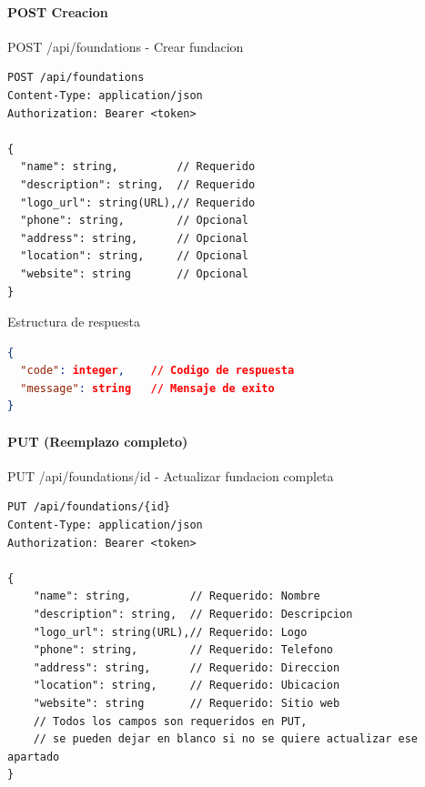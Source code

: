 \documentclass[11pt,a4paper]{article}
\begin{document}
\paragraph{POST Creacion}

\begin{center}
	\begin{minipage}{\textwidth}
		\begin{codebox}{POST /api/foundations - Crear fundacion}
			\begin{lstlisting}[language=HTTP]
POST /api/foundations
Content-Type: application/json
Authorization: Bearer <token>

{
  "name": string,         // Requerido
  "description": string,  // Requerido
  "logo_url": string(URL),// Requerido
  "phone": string,        // Opcional
  "address": string,      // Opcional
  "location": string,     // Opcional
  "website": string       // Opcional
}
\end{lstlisting}
		\end{codebox}
	\end{minipage}
\end{center}

\begin{center}
	\begin{minipage}{\textwidth}
		\begin{codebox}{Estructura de respuesta}
			\begin{lstlisting}[language=json]
{
  "code": integer,    // Codigo de respuesta
  "message": string   // Mensaje de exito
}
\end{lstlisting}
		\end{codebox}
	\end{minipage}
\end{center}
\paragraph{PUT (Reemplazo completo)}
\begin{center}
    \begin{minipage}{\textwidth}
        \begin{codebox}{PUT /api/foundations/{id} - Actualizar fundacion completa}
            \begin{lstlisting}[language=HTTP]
PUT /api/foundations/{id}
Content-Type: application/json
Authorization: Bearer <token>

{
    "name": string,         // Requerido: Nombre
    "description": string,  // Requerido: Descripcion
    "logo_url": string(URL),// Requerido: Logo
    "phone": string,        // Requerido: Telefono
    "address": string,      // Requerido: Direccion
    "location": string,     // Requerido: Ubicacion
    "website": string       // Requerido: Sitio web
    // Todos los campos son requeridos en PUT, 
    // se pueden dejar en blanco si no se quiere actualizar ese apartado
}
\end{lstlisting}
        \end{codebox}
    \end{minipage}
\end{center}
\end{document}
